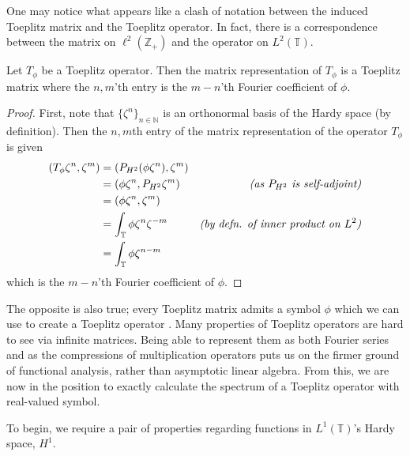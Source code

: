 \documentclass[../main.tex]{subfiles}
\begin{document}
One may notice what appears like a clash of notation between the induced
Toeplitz matrix and the Toeplitz operator. In fact, there is a correspondence
between the matrix on $\ell^2(\mathbb{Z}_+)$ and the operator on $L^2(\mathbb{T})$.

\begin{theorem}
  Let $T_\phi$ be a Toeplitz operator. Then the matrix representation of $T_\phi$
  is a Toeplitz matrix where the $n,m$'th entry is the $m-n$'th Fourier coefficient
  of $\phi$.
\end{theorem}
\begin{proof}\cite{garcia2023operator}
First, note that $\{\zeta^n\}_{n\in\mathbb{N}}$ is an orthonormal basis of
the Hardy space (by definition).
Then the $n,m$th entry of the matrix representation of the operator $T_\phi$ is given
  \begin{align*}
    (T_{\phi}\zeta^n, \zeta^m) & = (P_{H^2}(\phi\zeta^n), \zeta^m) & \\
                               & = (\phi\zeta^n, P_{H^2}\zeta^m) 
                                 & \text{\emph{(as $P_{H^2}$ is self-adjoint)}} \\
                               & = (\phi\zeta^n, \zeta^m) &\\
                               & = \int_{\mathbb{T}} \phi\zeta^n \zeta^{-m}
                                 & \text{\emph{(by defn. of inner product on $L^2$)}}\\
                               & = \int_{\mathbb{T}} \phi \zeta^{n-m} &\\
  \end{align*}
which is the $m-n$'th Fourier coefficient of $\phi$.
\end{proof}
The opposite is also true; every Toeplitz matrix admits a symbol $\phi$ which
we can use to create a Toeplitz operator \cite{garcia2023operator}.
Many properties of Toeplitz operators are hard to see via infinite matrices.
Being able to represent them as both Fourier series and as the  compressions of
multiplication operators puts us on the firmer ground of functional analysis,
rather than asymptotic linear algebra. From this, we
are now in the position to exactly calculate the spectrum of a Toeplitz operator
with real-valued symbol.

To begin, we require a pair of properties regarding functions in
$L^1(\mathbb{T})$'s Hardy space, $H^1$. 
\end{document}
